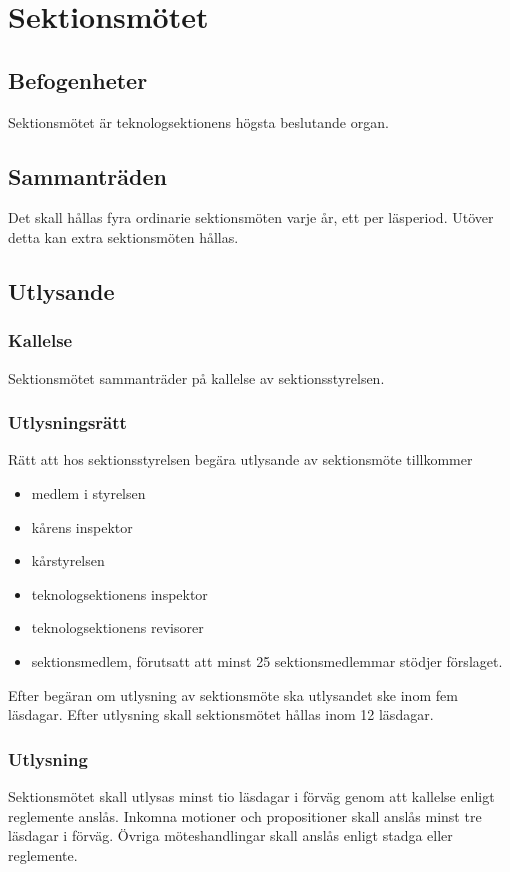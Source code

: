 \section{Sektionsmötet}

\subsection{Befogenheter}
Sektionsmötet är teknologsektionens högsta beslutande organ.

\subsection{Sammanträden}
Det skall hållas fyra ordinarie sektionsmöten varje år, ett per läsperiod. Utöver detta kan extra sektionsmöten hållas.

\subsection{Utlysande}
\label{sec:utlysande}

\subsubsection{Kallelse}
Sektionsmötet sammanträder på kallelse av sektionsstyrelsen.

\subsubsection{Utlysningsrätt}
Rätt att hos sektionsstyrelsen begära utlysande av sektionsmöte tillkommer

\begin{itemize}
	\item medlem i styrelsen
	\item kårens inspektor
	\item kårstyrelsen
	\item teknologsektionens inspektor
	\item teknologsektionens revisorer
	\item sektionsmedlem, förutsatt att minst 25 sektionsmedlemmar stödjer förslaget.
\end{itemize}

Efter begäran om utlysning av sektionsmöte ska utlysandet ske inom fem läsdagar. Efter utlysning skall sektionsmötet hållas inom 12 läsdagar.

\subsubsection{Utlysning}
Sektionsmötet skall utlysas minst tio läsdagar i förväg genom att kallelse enligt reglemente anslås. Inkomna motioner och propositioner skall anslås minst tre läsdagar i förväg. Övriga möteshandlingar skall anslås enligt stadga eller reglemente. 


